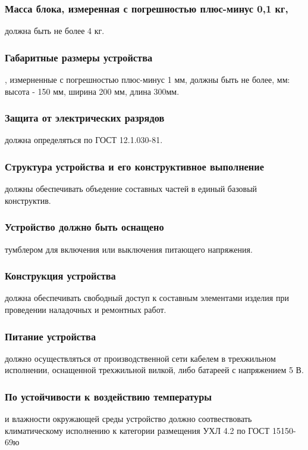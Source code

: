 \documentclass[a4paper]{bsuir-tor}
\begin{document}
  \subsubsection{Масса блока, измеренная с погрешностью плюс-минус 0,1 кг,}
  должна быть не более 4 кг.
  
  \subsubsection{Габаритные размеры устройства},
  измерненные с погрешностью плюс-минус 1 мм, должны быть не более, мм:
  высота - 150 мм, ширина 200 мм, длина 300мм.

  \subsubsection{Защита от электрических разрядов}
  должна определяться по ГОСТ 12.1.030-81.

  \subsubsection{Структура устройства и его конструктивное выполнение}
  должны обеспечивать объедение составных частей в единый базовый
  конструктив.

  \subsubsection{Устройство должно быть оснащено}
  тумблером для включения или выключения питающего напряжения.

  \subsubsection{Конструкция устройства}
  должна обеспечивать свободный доступ к составным элементами изделия
  при проведении наладочных и ремонтных работ.

  \subsubsection{Питание устройства} должно осуществляться от
  производственной сети кабелем в трехжильном исполнении, оснащенной
  трехжильной вилкой, либо батареей с напряжением 5 В.

  \subsubsection{По устойчивости к воздействию температуры}
  и влажности окружающей среды устройство должно соотвествовать
  климатическому исполнению к  категории размещения УХЛ 4.2 по
  ГОСТ 15150-69ю
\end{document}

